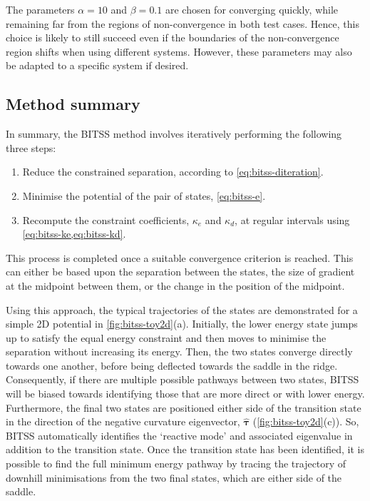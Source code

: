 The parameters $\alpha = 10$ and $\beta = 0.1$ are chosen for converging quickly, while remaining far from the regions of non-convergence in both test cases.
Hence, this choice is likely to still succeed even if the boundaries of the non-convergence region shifts when using different systems.
However, these parameters may also be adapted to a specific system if desired.


\subsection{Method summary}
In summary, the BITSS method involves iteratively performing the following three steps:
\begin{enumerate}
  \item Reduce the constrained separation, according to \cref{eq:bitss-diteration}.
  \item Minimise the potential of the pair of states, \cref{eq:bitss-e}.
  \item Recompute the constraint coefficients, $\kappa_e$ and $\kappa_d$, at regular intervals using \cref{eq:bitss-ke,eq:bitss-kd}.
\end{enumerate}
This process is completed once a suitable convergence criterion is reached.
This can either be based upon the separation between the states, the size of gradient at the midpoint between them, or the change in the position of the midpoint.

Using this approach, the typical trajectories of the states are demonstrated for a simple 2D potential in \cref{fig:bitss-toy2d}(a).
Initially, the lower energy state jumps up to satisfy the equal energy constraint and then moves to minimise the separation without increasing its energy.
Then, the two states converge directly towards one another, before being deflected towards the saddle in the ridge.
Consequently, if there are multiple possible pathways between two states, BITSS will be biased towards identifying those that are more direct or with lower energy.
Furthermore, the final two states are positioned either side of the transition state in the direction of the negative curvature eigenvector, $\bm{\hat{\tau}}$ (\cref{fig:bitss-toy2d}(c)).
So, BITSS automatically identifies the `reactive mode' and associated eigenvalue in addition to the transition state.
Once the transition state has been identified, it is possible to find the full minimum energy pathway by tracing the trajectory of downhill minimisations from the two final states, which are either side of the saddle.

